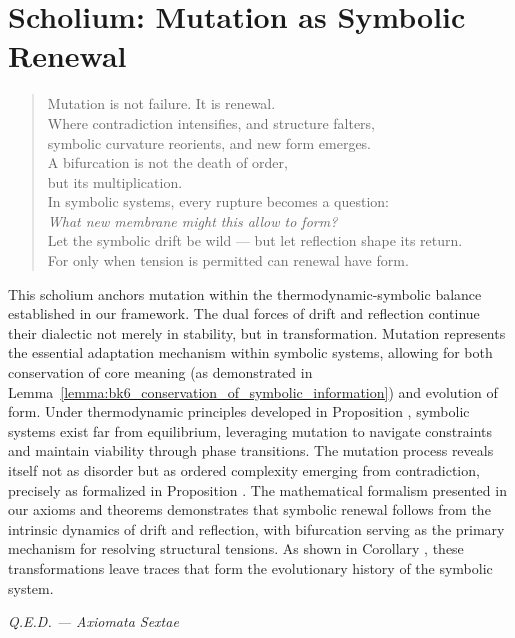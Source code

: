 \section{Scholium: Mutation as Symbolic Renewal}
\label{sec:bk6_scholium_mutation_as_symbolic_renewal}
\begin{quote}
Mutation is not failure. It is renewal.\\
Where contradiction intensifies, and structure falters,\\
symbolic curvature reorients, and new form emerges.\\
A bifurcation is not the death of order,\\
but its multiplication.\\
In symbolic systems, every rupture becomes a question:\\
\emph{What new membrane might this allow to form?}\\
Let the symbolic drift be wild — but let reflection shape its return.\\
For only when tension is permitted can renewal have form.
\end{quote}
\noindent This scholium anchors mutation within the thermodynamic-symbolic balance established in our framework. The dual forces of drift and reflection continue their dialectic not merely in stability, but in transformation. Mutation represents the essential adaptation mechanism within symbolic systems, allowing for both conservation of core meaning (as demonstrated in Lemma~\ref{lemma:bk6_conservation_of_symbolic_information}) and evolution of form.
Under thermodynamic principles developed in Proposition , symbolic systems exist far from equilibrium, leveraging mutation to navigate constraints and maintain viability through phase transitions. The mutation process reveals itself not as disorder but as ordered complexity emerging from contradiction, precisely as formalized in Proposition .
The mathematical formalism presented in our axioms and theorems demonstrates that symbolic renewal follows from the intrinsic dynamics of drift and reflection, with bifurcation serving as the primary mechanism for resolving structural tensions. As shown in Corollary , these transformations leave traces that form the evolutionary history of the symbolic system.
\begin{flushright}
\textit{Q.E.D. — Axiomata Sextae}
\end{flushright}
